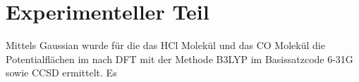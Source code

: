 \section{Experimenteller Teil}

Mittels Gaussian wurde für die das HCl Molekül und das CO Molekül die Potentialflächen im nach DFT mit der Methode B3LYP im Basissatzcode 6-31G sowie CCSD ermittelt. Es 